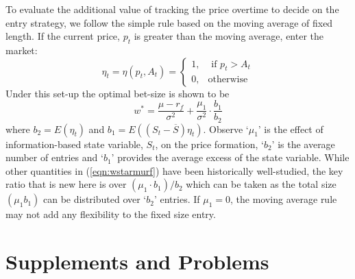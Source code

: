To evaluate the additional value of tracking the price overtime to decide on the entry strategy, we follow the simple rule based on the moving average of fixed length. If the current price, $p_t$ is greater than the moving average, enter the market:
	\begin{equation}\label{eqn:etatetapt}
	\eta_t= \eta(p_t,A_t)= \begin{cases}
	1, & \text{ if } p_t>A_t \\
	0, & \text{otherwise}
	\end{cases}
	\end{equation}
Under this set-up the optimal bet-size is shown to be
	\begin{equation}\label{eqn:wstarmurf}
	w^*= \dfrac{\mu - r_f}{\sigma^2} + \dfrac{\mu_1}{\sigma^2} \cdot \dfrac{b_1}{b_2}
	\end{equation}
where $b_2=E(\eta_t)$ and $b_1=E((S_t - \overline{S}) \eta_t)$. Observe `$\mu_1$' is the effect of information-based state variable, $S_t$, on the price formation, `$b_2$' is the average number of entries and `$b_1$' provides the average excess of the state variable. While other quantities in (\ref{eqn:wstarmurf}) have been historically well-studied, the key ratio that is new here is over $(\mu_1 \cdot b_1)/b_2$ which can be taken as the total size $(\mu_1b_1)$ can be distributed over `$b_2$' entries. If $\mu_1=0$, the moving average rule may not add any flexibility to the fixed size entry. 


\section{Supplements and Problems}

